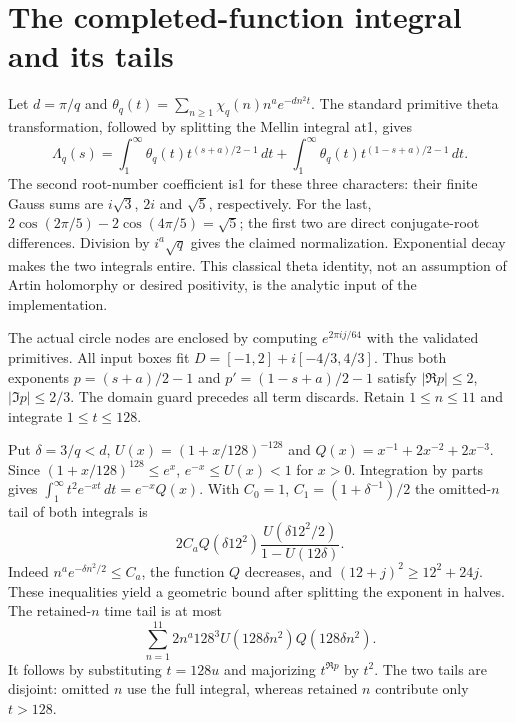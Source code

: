 \documentclass[11pt]{article}
\theoremstyle{definition}\newtheorem{definition}[theorem]{Definition}
\theoremstyle{remark}\newtheorem{remark}[theorem]{Remark}
\begin{document}
\section{The completed-function integral and its tails}
Let $d=\pi/q$ and $\theta_q(t)=\sum_{n\ge1}\chi_q(n)n^ae^{-dn^2t}$.
The standard primitive theta transformation, followed by splitting the Mellin
integral at1, gives
\[
 \Lambda_q(s)=\int_1^\infty\theta_q(t)t^{(s+a)/2-1}\,dt+
              \int_1^\infty\theta_q(t)t^{(1-s+a)/2-1}\,dt.
\]
The second root-number coefficient is1 for these three characters: their
finite Gauss sums are $i\sqrt3$, $2i$ and $\sqrt5$, respectively.
For the last, $2\cos(2\pi/5)-2\cos(4\pi/5)=\sqrt5$; the first two are direct
conjugate-root differences. Division by $i^a\sqrt q$ gives the claimed
normalization. Exponential decay makes the two integrals entire. This classical
theta identity, not an assumption of Artin holomorphy or desired positivity,
is the analytic input of the implementation.

The actual circle nodes are enclosed by computing $e^{2\pi i j/64}$ with
the validated primitives. All input boxes fit
$D=[-1,2]+i[-4/3,4/3]$. Thus both exponents
$p=(s+a)/2-1$ and $p'=(1-s+a)/2-1$ satisfy
$|\Re p|\le2$, $|\Im p|\le2/3$. The domain guard precedes all term discards.
Retain $1\le n\le11$ and integrate $1\le t\le128$.

Put $\delta=3/q<d$, $U(x)=(1+x/128)^{-128}$ and
$Q(x)=x^{-1}+2x^{-2}+2x^{-3}$. Since $(1+x/128)^{128}\le e^x$,
$e^{-x}\le U(x)<1$ for $x>0$. Integration by parts gives
$\int_1^\infty t^2e^{-xt}\,dt=e^{-x}Q(x)$.
With $C_0=1$, $C_1=(1+\delta^{-1})/2$ the omitted-$n$ tail of both integrals is
\[
 2C_aQ(\delta12^2)
 \frac{U(\delta12^2/2)}{1-U(12\delta)}.
\]
Indeed $n^ae^{-\delta n^2/2}\le C_a$, the function $Q$ decreases, and
$(12+j)^2\ge12^2+24j$. These inequalities yield a geometric bound after
splitting the exponent in halves. The retained-$n$ time tail is at most
\[
 \sum_{n=1}^{11}2n^a128^3U(128\delta n^2)Q(128\delta n^2).
\]
It follows by substituting $t=128u$ and majorizing $t^{\Re p}$ by $t^2$.
The two tails are disjoint: omitted $n$ use the full integral, whereas
retained $n$ contribute only $t>128$.
\end{document}
